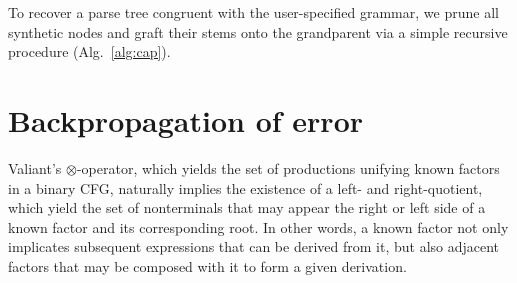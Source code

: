 \documentclass[sigplan,review,anonymous,acmsmall]{acmart}\settopmatter{printfolios=false,printccs=false,printacmref=false}
\begin{document}
    \noindent To recover a parse tree congruent with the user-specified grammar, we prune all synthetic nodes and graft their stems onto the grandparent via a simple recursive procedure (Alg.~\ref{alg:cap}).%

 \section{Backpropagation of error}


  Valiant's $\otimes$-operator, which yields the set of productions unifying known factors in a binary CFG, naturally implies the existence of a left- and right-quotient, which yield the set of nonterminals that may appear the right or left side of a known factor and its corresponding root. In other words, a known factor not only implicates subsequent expressions that can be derived from it, but also adjacent factors that may be composed with it to form a given derivation.
\end{document}
